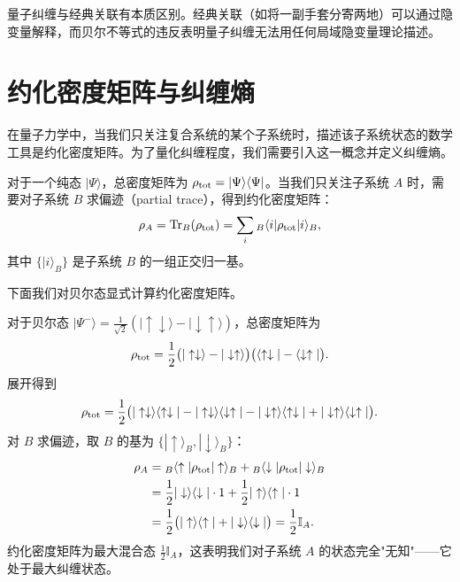 \begin{remark}
量子纠缠与经典关联有本质区别。经典关联（如将一副手套分寄两地）可以通过隐变量解释，而贝尔不等式的违反表明量子纠缠无法用任何局域隐变量理论描述。
\end{remark}

\section{约化密度矩阵与纠缠熵}

在量子力学中，当我们只关注复合系统的某个子系统时，描述该子系统状态的数学工具是约化密度矩阵。为了量化纠缠程度，我们需要引入这一概念并定义纠缠熵。

\begin{definition}[密度矩阵与约化密度矩阵]
对于一个纯态 $|\Psi\rangle$，总密度矩阵为 $\rho_{\rm tot} = |\Psi\rangle\langle\Psi|$。当我们只关注子系统 $A$ 时，需要对子系统 $B$ 求偏迹（partial trace），得到约化密度矩阵：
\begin{equation}\label{eq:reduced_dm}
    \rho_A = \Tr_B(\rho_{\rm tot}) = \sum_{i} {}_B\langle i | \rho_{\rm tot} | i\rangle_B,
\end{equation}
其中 $\{|i\rangle_B\}$ 是子系统 $B$ 的一组正交归一基。
\end{definition}

下面我们对贝尔态显式计算约化密度矩阵。

\begin{example}[贝尔态的约化密度矩阵]
对于贝尔态 $|\Psi^-\rangle = \frac{1}{\sqrt{2}}(|\uparrow\downarrow\rangle - |\downarrow\uparrow\rangle)$，总密度矩阵为
\begin{equation}
    \rho_{\rm tot} = \frac{1}{2}\big(|\uparrow\downarrow\rangle - |\downarrow\uparrow\rangle\big)\big(\langle\uparrow\downarrow| - \langle\downarrow\uparrow|\big).
\end{equation}
展开得到
\begin{equation}
    \rho_{\rm tot} = \frac{1}{2}\big(|\uparrow\downarrow\rangle\langle\uparrow\downarrow| - |\uparrow\downarrow\rangle\langle\downarrow\uparrow| - |\downarrow\uparrow\rangle\langle\uparrow\downarrow| + |\downarrow\uparrow\rangle\langle\downarrow\uparrow|\big).
\end{equation}
对 $B$ 求偏迹，取 $B$ 的基为 $\{|\uparrow\rangle_B, |\downarrow\rangle_B\}$：
\begin{align}
    \rho_A &= {}_B\langle\uparrow|\rho_{\rm tot}|\uparrow\rangle_B + {}_B\langle\downarrow|\rho_{\rm tot}|\downarrow\rangle_B \nonumber\\
    &= \frac{1}{2}|\downarrow\rangle\langle\downarrow| \cdot 1 + \frac{1}{2}|\uparrow\rangle\langle\uparrow| \cdot 1 \nonumber\\
    &= \frac{1}{2}\big(|\uparrow\rangle\langle\uparrow| + |\downarrow\rangle\langle\downarrow|\big) = \frac{1}{2}\mathbb{I}_A.
\end{align}
约化密度矩阵为最大混合态 $\frac{1}{2}\mathbb{I}_A$，这表明我们对子系统 $A$ 的状态完全"无知"——它处于最大纠缠状态。
\end{example}

